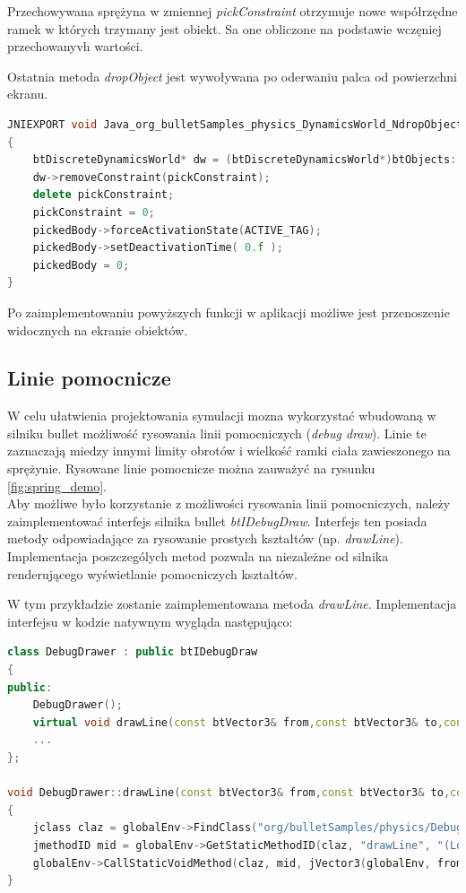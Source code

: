 Przechowywana sprężyna w zmiennej \emph{pickConstraint} otrzymuje nowe
współrzędne ramek w których trzymany jest obiekt. Sa one obliczone na podstawie
wczęniej przechowanyvh wartości.

Ostatnia metoda \emph{dropObject} jest wywoływana po oderwaniu palca od
powierzchni ekranu.

\begin{lstlisting}[language=c++, caption=Implementacja
metody dropObject,label=lis:dropObject]
JNIEXPORT void Java_org_bulletSamples_physics_DynamicsWorld_NdropObject( JNIEnv* env, jobject self, jint id, jobject jRayFrom, jobject jRayTo )
{
	btDiscreteDynamicsWorld* dw = (btDiscreteDynamicsWorld*)btObjects::get(id);
	dw->removeConstraint(pickConstraint);
	delete pickConstraint;
	pickConstraint = 0;
	pickedBody->forceActivationState(ACTIVE_TAG);
	pickedBody->setDeactivationTime( 0.f );
	pickedBody = 0;
}
\end{lstlisting}

Po zaimplementowaniu powyższych funkcji w aplikacji możliwe jest przenoszenie
widocznych na ekranie obiektów.

\subsection{Linie pomocnicze}\label{sec:debugDrawer}
W celu ułatwienia projektowania symulacji mozna wykorzystać
wbudowaną w silniku bullet możliwość rysowania linii pomocniczych (\emph{debug
draw}). Linie te zaznaczają miedzy innymi limity obrotów i wielkość ramki ciała
zawieszonego na sprężynie. Rysowane linie pomocnicze można zauważyć na rysunku
\ref{fig:spring_demo}.\\
Aby możliwe było korzystanie z możliwości rysowania linii pomocniczych, należy
zaimplementować interfejs silnika bullet \emph{btIDebugDraw}. Interfejs ten
posiada metody odpowiadające za rysowanie prostych kształtów (np. \emph{drawLine}).
Implementacja poszczególych metod pozwala na niezależne od silnika renderującego
wyświetlanie pomocniczych kształtów.

W tym przykładzie zostanie zaimplementowana metoda \emph{drawLine}.
Implementacja interfejsu w kodzie natywnym wygląda następująco:

\begin{lstlisting}[language=c++, caption=Deklaracja klasy
DebugDrawer,label=lis:debugDrawer_cpp]
class DebugDrawer : public btIDebugDraw
{
public:
	DebugDrawer();
	virtual void drawLine(const btVector3& from,const btVector3& to,const btVector3& color); 
	...
};

void DebugDrawer::drawLine(const btVector3& from,const btVector3& to,const btVector3& fromColor, const btVector3& toColor)
{
	jclass claz = globalEnv->FindClass("org/bulletSamples/physics/DebugDrawer");
	jmethodID mid = globalEnv->GetStaticMethodID(claz, "drawLine", "(Lorg/bulletSamples/geometry/Vector3;Lorg/bulletSamples/geometry/Vector3;Lorg/bulletSamples/geometry/Vector3;Lorg/bulletSamples/geometry/Vector3;)V");
	globalEnv->CallStaticVoidMethod(claz, mid, jVector3(globalEnv, from), jVector3(globalEnv, to), jVector3(globalEnv, fromColor), jVector3(globalEnv, toColor));
}
\end{lstlisting}

